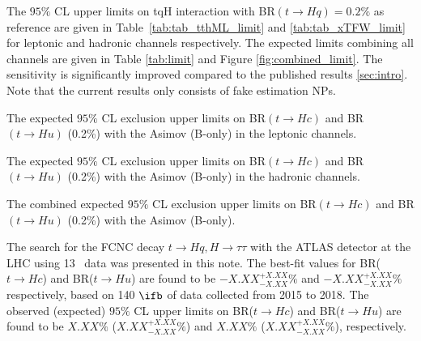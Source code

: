 The $95\%$ CL upper limits on tqH interaction with BR$(t\to Hq)=0.2\%$ as reference are given in Table~\ref{tab:tab_tthML_limit} and \ref{tab:tab_xTFW_limit} for leptonic and hadronic channels respectively. The expected limits combining all channels are given in Table \ref{tab:limit} and Figure \ref{fig:combined_limit}. The sensitivity is significantly improved compared to the published results \ref{sec:intro}. 
Note that the current results only consists of fake estimation NPs.

\begin{table}[htb]
\caption{ The expected $95\%$ CL exclusion upper limits on BR$(t\to Hc)$ and BR$(t\to Hu)$ (0.2\%) with the Asimov (B-only) in the leptonic channels.}

\label{tab:tab_tthML_limit}
\end{table}

\begin{table}[htb]
\caption{ The expected $95\%$ CL exclusion upper limits on BR$(t\to Hc)$ and BR$(t\to Hu)$ (0.2\%) with the Asimov (B-only) in the hadronic channels.}

\label{tab:tab_xTFW_limit}
\end{table}

\begin{table}[htb]
\caption{ The combined expected $95\%$ CL exclusion upper limits on BR$(t\to Hc)$ and BR$(t\to Hu)$ (0.2\%) with the Asimov (B-only).}

\label{tab:limit}
\end{table}



The search for the FCNC decay $t\to Hq, H\to\tau\tau$ with the ATLAS detector at the LHC using 13~\TeV{} data was presented in this note. The best-fit values for BR($t\to Hc$) and BR($t\to Hu$) are found to be $-X.XX^{+X.XX}_{-X.XX}\%$ and $-X.XX^{+X.XX}_{-X.XX}\%$ respectively, based on 140 $\ifb$ of data collected from 2015 to 2018. The observed (expected) $95\%$ CL upper limits on BR($t\to Hc$) and BR($t\to Hu$) are found to be $X.XX\%$ ($X.XX^{+X.XX}_{-X.XX}\%$) and $X.XX\%$ ($X.XX^{+X.XX}_{-X.XX}\%$), respectively.
